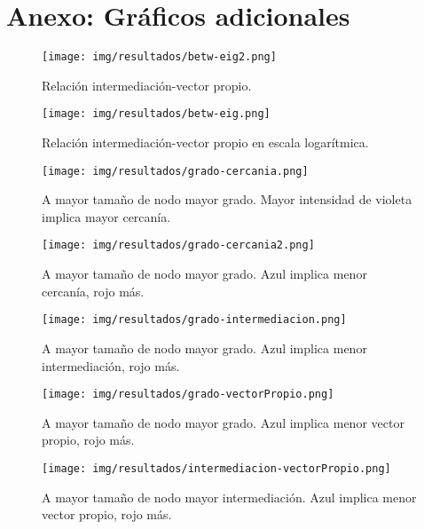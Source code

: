 \section{Anexo: Gráficos adicionales}

\begin{figure}[ht]
    \centerfloat
    \texttt{[image: img/resultados/betw-eig2.png]}
    \caption{Relación intermediación-vector propio.}
\end{figure}

\begin{figure}[ht]
    \centerfloat
    \texttt{[image: img/resultados/betw-eig.png]}
    \caption{Relación intermediación-vector propio en escala logarítmica.}
\end{figure}


\begin{figure}[ht]
    \centerfloat
    \texttt{[image: img/resultados/grado-cercania.png]}
    \caption{A mayor tamaño de nodo mayor grado. Mayor intensidad de violeta implica mayor cercanía.}
\end{figure}

\begin{figure}[ht]
    \centerfloat
    \texttt{[image: img/resultados/grado-cercania2.png]}
    \caption{A mayor tamaño de nodo mayor grado. Azul implica menor cercanía, rojo más.}
\end{figure}

\begin{figure}[ht]
    \centerfloat
    \texttt{[image: img/resultados/grado-intermediacion.png]}
    \caption{A mayor tamaño de nodo mayor grado. Azul implica menor intermediación, rojo más.}
\end{figure}

\begin{figure}[ht]
    \centerfloat
    \texttt{[image: img/resultados/grado-vectorPropio.png]}
    \caption{A mayor tamaño de nodo mayor grado. Azul implica menor vector propio, rojo más.}
\end{figure}

\begin{figure}[ht]
    \centerfloat
    \texttt{[image: img/resultados/intermediacion-vectorPropio.png]}
    \caption{A mayor tamaño de nodo mayor intermediación. Azul implica menor vector propio, rojo más.}
\end{figure}